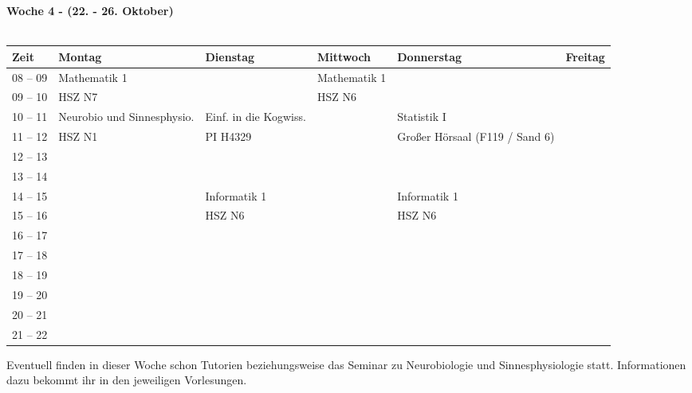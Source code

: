 \vfil
\textbf{Woche 4 - (22. - 26. Oktober)}\\
\\
\begin{tabular}{|l|p{}|p{}|p{}|p{}|p{}|} \hline
 Zeit & Montag & Dienstag & Mittwoch & Donnerstag & Freitag \\ \hline \hline
 08 -- 09 & \footnotesize{Mathematik 1} & & \footnotesize{Mathematik 1} & & \\ \cline{1-1}
 09 -- 10 & \scriptsize{HSZ N7} & & \scriptsize{HSZ N6} & & \\ \hline
 10 -- 11 & \footnotesize{Neurobio und Sinnesphysio.} & \footnotesize{Einf. in die Kogwiss.} & & \footnotesize{Statistik I} & \\ \cline{1-1} 
 11 -- 12 & \scriptsize{HSZ N1} & \scriptsize{PI H4329} & & \scriptsize{Großer Hörsaal (F119 / Sand 6)} & \\ \hline
 12 -- 13 & & & & & \\ \cline{1-1}
 13 -- 14 & & & & & \\ \hline
 14 -- 15 & & \footnotesize{Informatik 1} & & \footnotesize{Informatik 1} & \\ \cline{1-1}
 15 -- 16 & & \scriptsize{HSZ N6} & & \scriptsize{HSZ N6} & \\ \hline
 16 -- 17 & & & & & \\ \cline{1-1}
 17 -- 18 & & & & & \\ \hline
 18 -- 19 & & & & & \\ \cline{1-1} 
 19 -- 20 & & & & & \\ \hline
 20 -- 21 & & & & & \\ \cline{1-1}
 21 -- 22 & & & & & \\ \hline
\end{tabular}


\footnotesize{Eventuell finden in dieser Woche schon Tutorien beziehungsweise das Seminar zu Neurobiologie und Sinnesphysiologie statt. Informationen dazu bekommt ihr in den jeweiligen Vorlesungen.}
\normalsize
\newpage


